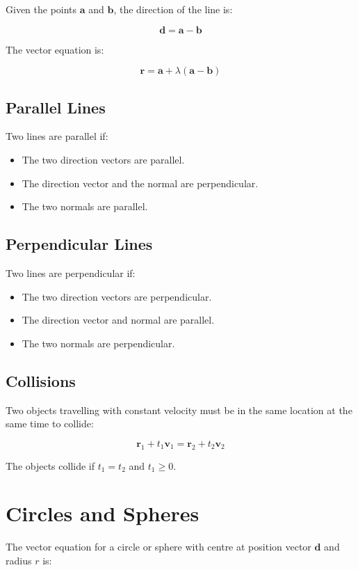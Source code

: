 \documentclass[a4paper,11pt]{report}
\newcommand{\bb}{\boldsymbol}
\begin{document}
Given the points $\bb{a}$ and $\bb{b}$, the direction of the line is:

$$
\bb{d} = \bb{a} - \bb{b}
$$

The vector equation is:

$$
\bb{r} = \bb{a} + \lambda (\bb{a} - \bb{b})
$$

\subsection{Parallel Lines}

Two lines are parallel if:

\begin{itemize}
\item The two direction vectors are parallel.
\item The direction vector and the normal are perpendicular.
\item The two normals are parallel.
\end{itemize}

\subsection{Perpendicular Lines}

Two lines are perpendicular if:

\begin{itemize}
\item The two direction vectors are perpendicular.
\item The direction vector and normal are parallel.
\item The two normals are perpendicular.
\end{itemize}

\subsection{Collisions}

Two objects travelling with constant velocity must be in the same location at
the same time to collide:

$$
\bb{r}_1 + t_1 \bb{v}_1 = \bb{r}_2 + t_2 \bb{v}_2
$$

The objects collide if $t_1 = t_2$ and $t_1 \geq 0$.


\section{Circles and Spheres}

The vector equation for a circle or sphere with centre at position vector
$\bb{d}$ and radius $r$ is:
\end{document}
